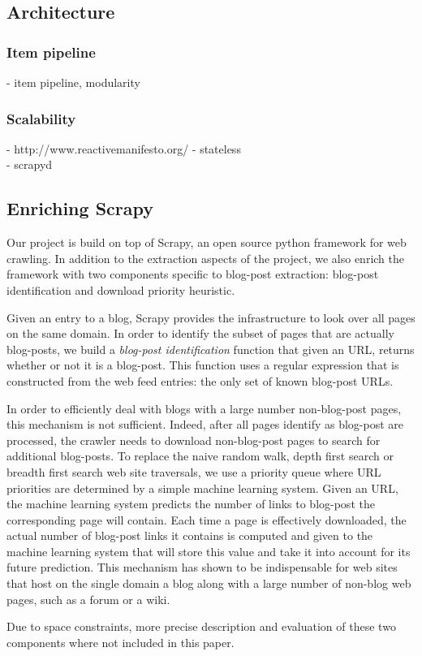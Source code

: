 \subsection{Architecture}
\subsubsection{Item pipeline}
- item pipeline, modularity \\

\subsubsection{Scalability}
- http://www.reactivemanifesto.org/
- stateless \\
- scrapyd \\


\subsection{Enriching Scrapy}
Our project is build on top of Scrapy, an open source python framework for web crawling. In addition to the extraction aspects of the project, we also enrich the framework with two components specific to blog-post extraction: blog-post identification and download priority heuristic.

Given an entry to a blog, Scrapy provides the infrastructure to look over all pages on the same domain. In order to identify the subset of pages that are actually blog-posts, we build a \emph{blog-post identification} function that given an URL, returns whether or not it is a blog-post. This function uses a regular expression that is constructed from the web feed entries: the only set of known blog-post URLs.

In order to efficiently deal with blogs with a large number non-blog-post pages, this mechanism is not sufficient. Indeed, after all pages identify as blog-post are processed, the crawler needs to download non-blog-post pages to search for additional blog-posts. To replace the naive random walk, depth first search or breadth first search web site traversals, we use a priority queue where URL priorities are determined by a simple machine learning system. Given an URL, the machine learning system predicts the number of links to blog-post the corresponding page will contain. Each time a page is effectively downloaded, the actual number of blog-post links it contains is computed and given to the machine learning system that will store this value and take it into account for its future prediction. This mechanism has shown to be indispensable for web sites that host on the single domain a blog along with a large number of non-blog web pages, such as a forum or a wiki.

Due to space constraints, more precise description and evaluation of these two components where not included in this paper.
